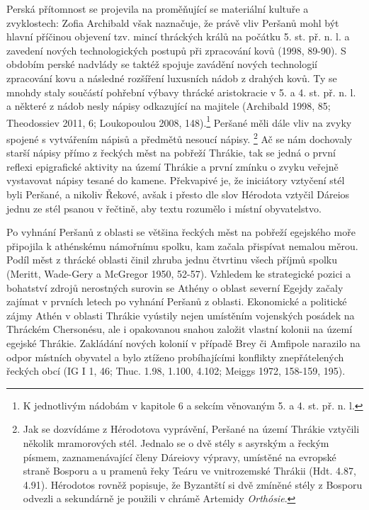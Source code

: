 Perská přítomnost se projevila na proměňující se materiální kultuře a zvyklostech: Zofia Archibald však naznačuje, že právě vliv Peršanů mohl být hlavní příčinou objevení tzv. mincí thráckých králů na počátku 5. st. př. n. l. a zavedení nových technologických postupů při zpracování kovů (1998, 89-90). S obdobím perské nadvlády se taktéž spojuje zavádění nových technologií zpracování kovu a následné rozšíření luxusních nádob z drahých kovů. Ty se mnohdy staly součástí pohřební výbavy thrácké aristokracie v 5. a 4. st. př. n. l. a některé z nádob nesly nápisy odkazující na majitele (Archibald 1998, 85; Theodossiev 2011, 6; Loukopoulou 2008, 148).\footnote{K jednotlivým nádobám v kapitole 6 a sekcím věnovaným 5. a 4. st. př. n. l.} Peršané měli dále vliv na zvyky spojené s vytvářením nápisů a předmětů nesoucí nápisy. \footnote{Jak se dozvídáme z Hérodotova vyprávění, Peršané na území Thrákie vztyčili několik mramorových stél. Jednalo se o dvě stély s asyrským a řeckým písmem, zaznamenávající členy Dáreiovy výpravy, umístěné na evropské straně Bosporu a u pramenů řeky Teáru ve vnitrozemské Thrákii (Hdt. 4.87, 4.91). Hérodotos rovněž popisuje, že Byzantští si dvě zmíněné stély z Bosporu odvezli a sekundárně je použili v chrámě Artemidy {\em Orthósie}.} Ač se nám dochovaly starší nápisy přímo z řeckých měst na pobřeží Thrákie, tak se jedná o první reflexi epigrafické aktivity na území Thrákie a první zmínku o zvyku veřejně vystavovat nápisy tesané do kamene. Překvapivé je, že iniciátory vztyčení stél byli Peršané, a nikoliv Řekové, avšak i přesto dle slov Hérodota vztyčil Dáreios jednu ze stél psanou v řečtině, aby textu rozumělo i místní obyvatelstvo.

Po vyhnání Peršanů z oblasti se většina řeckých měst na pobřeží egejského moře připojila k athénskému námořnímu spolku, kam začala přispívat nemalou měrou. Podíl měst z thrácké oblasti činil zhruba jednu čtvrtinu všech příjmů spolku (Meritt, Wade-Gery a McGregor 1950, 52-57). Vzhledem ke strategické pozici a bohatství zdrojů nerostných surovin se Athény o oblast severní Egejdy začaly zajímat v prvních letech po vyhnání Peršanů z oblasti. Ekonomické a politické zájmy Athén v oblasti Thrákie vyústily nejen umístěním vojenských posádek na Thráckém Chersonésu, ale i opakovanou snahou založit vlastní kolonii na území egejské Thrákie. Zakládání nových kolonií v případě Brey či Amfipole narazilo na odpor místních obyvatel a bylo ztíženo probíhajícími konflikty znepřátelených řeckých obcí (IG I 1, 46; Thuc. 1.98, 1.100, 4.102; Meiggs 1972, 158-159, 195).


